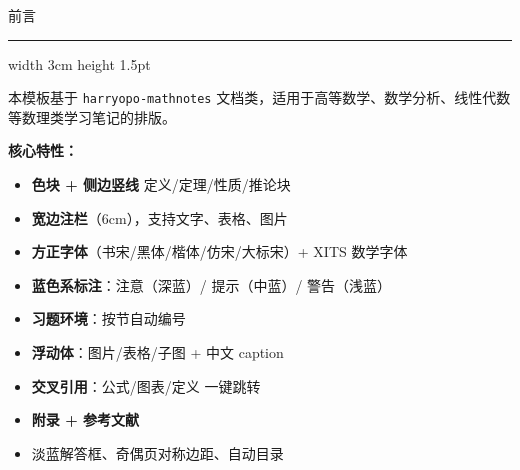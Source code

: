 \documentclass{harryopo-mathnotes}
\begin{document}
\maketitle
\thispagestyle{empty}
\cleardoublepage

\vspace*{2cm}

\noindent
\begin{minipage}[t]{0.55\textwidth}
  \phantom{x}
\end{minipage}%
\begin{minipage}[t]{0.45\textwidth}
  {\TitleFontc\fzdbs\color{DeepSkyBlue} 前言}
  \\[1cm]
  {\hrule width 3cm height 1.5pt\color{DeepSkyBlue!60}}
\end{minipage}

\vspace{2cm}

\noindent
\begin{minipage}[t]{0.15\textwidth}\end{minipage}%
\begin{minipage}[t]{0.85\textwidth}
{\large\fzfs
本模板基于 \texttt{harryopo-mathnotes} 文档类，适用于高等数学、数学分析、线性代数等数理类学习笔记的排版。

\vspace{1em}
\textbf{核心特性：}
\begin{itemize}
  \item \textbf{色块 + 侧边竖线} 定义/定理/性质/推论块
  \item \textbf{宽边注栏}（6cm），支持文字、表格、图片
  \item \textbf{方正字体}（书宋/黑体/楷体/仿宋/大标宋）+ XITS 数学字体
  \item \textbf{蓝色系标注}：注意（深蓝）/ 提示（中蓝）/ 警告（浅蓝）
  \item \textbf{习题环境}：按节自动编号
  \item \textbf{浮动体}：图片/表格/子图 + 中文 caption
  \item \textbf{交叉引用}：公式/图表/定义 一键跳转
  \item \textbf{附录 + 参考文献}
  \item 淡蓝解答框、奇偶页对称边距、自动目录
\end{itemize}
}
\end{minipage}
\thispagestyle{empty}
\cleardoublepage
\end{document}
